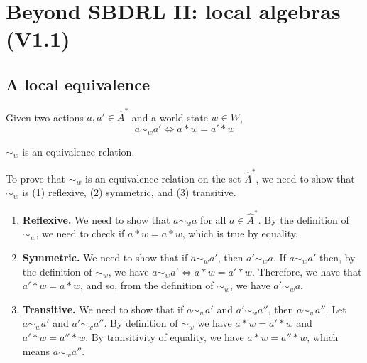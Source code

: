 \chapter{
Beyond SBDRL II: local algebras
(V1.1)
}

\section{
A local equivalence
}

\begin{definition}
	Given two actions $a, a' \in \hat{A}^{*}$ and a world state $w \in W$,
	\begin{equation}
		a \sim_{w} a' \iff a \ast w = a' \ast w
	\end{equation}
\end{definition}

\begin{propositionE}
    $\sim_{w}$ is an equivalence relation.
\end{propositionE}
\begin{proofE}
    To prove that $\sim_{w}$ is an equivalence relation on the set $\hat{A}^{*}$, we need to show that $\sim_{w}$ is (1) reflexive, (2) symmetric, and (3) transitive.
    \begin{enumerate}
        \item \textbf{Reflexive.}
        We need to show that $a \sim_{w} a$ for all $a \in \hat{A}^{*}$.
        By the definition of $\sim_{w}$, we need to check if $a \ast w = a \ast w$, which is true by equality.

        \item \textbf{Symmetric.}
        We need to show that if $a \sim_{w} a'$, then $a' \sim_{w} a$.
        If $a \sim_{w} a'$ then, by the definition of $\sim_{w}$, we have $a \sim_{w} a' \iff a \ast w = a' \ast w$.
        Therefore, we have that $a' \ast w = a \ast w$, and so, from the definition of $\sim_{w}$, we have $a' \sim_{w} a$.

        \item \textbf{Transitive.}
        We need to show that if $a \sim_{w} a'$ and $a' \sim_{w} a''$, then $a \sim_{w} a''$.
        Let $a \sim_{w} a'$ and $a' \sim_{w} a''$.
        By definition of $\sim_{w}$ we have $a \ast w = a' \ast w$ and $a' \ast w = a'' \ast w$.
        By transitivity of equality, we have $a \ast w = a'' \ast w$, which means $a \sim_{w} a''$.
    \end{enumerate}
\end{proofE}

